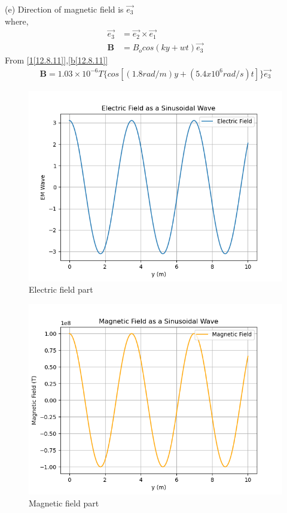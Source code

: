 \documentclass[journal,12pt,twocolumn]{IEEEtran}
\theoremstyle{remark}
\begin{document}
(e)
Direction of magnetic field is $\vec{e_3}$\\
where,
\begin{align}
	\vec{e_3}&=\vec{e_2} \times \vec{e_1}\\
	\textbf{B}&=B_ocos(ky+wt)\vec{e_3}\label{b[12.8.11]}
\end{align}
 From \eqref{1[12.8.11]},\eqref{b[12.8.11]}
\begin{align}
	\textbf{B}=1.03\times10^{-6}T\{cos[(1.8rad/m)y+(5.4x10^{6}rad/s)t]\}\vec{e_3}
\end{align}
\begin{figure}[h]
\centering
\includegraphics[width=1\columnwidth]{ncert-physics/12/8/11/figures/ewave.png}
\caption{Electric field part}
\label{ewave[12.8.11]}
\end{figure}
\begin{figure}[h]
\centering
\includegraphics[width=1\columnwidth]{ncert-physics/12/8/11/figures/mwave.png}
\caption{Magnetic field part}
\label{mwave[12.8.11]}
\end{figure}



\end{document}
